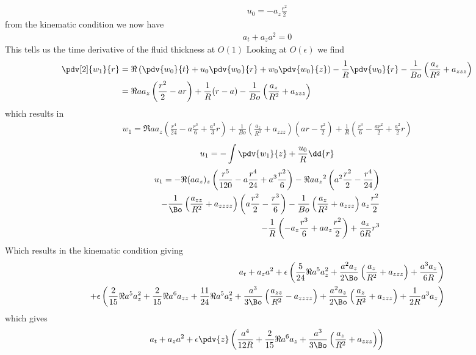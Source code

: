 \documentclass[12pt]{article}
\begin{document}
\begin{align}
u_0 = - a_z \frac{r^2}{2}
\end{align}
from the kinematic condition we now have
\begin{align}
a_t + a_za^2 = 0 
\end{align}
This tells us the time derivative of the fluid thickness at $O(1)$
Looking at $O(\epsilon)$ we find 
\begin{align}
\pdv[2]{w_1}{r}& = \Re\left(\pdv{w_0}{t}+ u_0\pdv{w_0}{r}+ w_0\pdv{w_0}{z}\right)- \frac{1}{R}\pdv{w_0}{r} -\frac{1}{Bo}\left(\frac{a_z}{R^2}+a_{zzz}\right)\\&
=\Re aa_z\left(\frac{r^2}{2}- a r\right)+\frac{1}{R}(r-a) -\frac{1}{Bo}\left(\frac{a_z}{R^2}+a_{zzz}\right)
\end{align}
which results in 
\begin{align}
w_1 = \Re a a_z\left(\frac{r^4}{24}- a\frac{r^3}{6}+\frac{a^3}{3}r\right)+ \frac{1}{Bo}\left(\frac{a_z}{R^2}+a_{zzz}\right)\left(ar - \frac{r^2}{2}\right)+\frac{1}{R}\left(\frac{r^3}{6}- \frac{ar^2}{2}+ \frac{a^2}{2}r\right)
\end{align}
\begin{align}
u_1 = -\int{\pdv{w_1}{z}+ \frac{u_0}{R}\dd{r}}
\end{align}
\begin{align}
u_1 = -\Re (aa_z)_z\left(\frac{r^5}{120}- a\frac{r^4}{24}+a^3\frac{r^2}{6}\right)- \Re a {a_z}^2\left(a^2\frac{r^2}{2}-\frac{r^4}{24}\right)\\-\frac{1}{\Bo}\left(\frac{a_{zz}}{R^2}+a_{zzzz}\right)\left(a\frac{r^2}{2}- \frac{r^3}{6}\right)-\frac{1}{Bo}\left(\frac{a_z}{R^2}+a_{zzz}\right)a_z\frac{r^2}{2}\\
-\frac{1}{R}\left(-a_z\frac{r^3}{6}+aa_z \frac{r^2}{2}\right)+\frac{a_z}{6R}r^3
\end{align}
Which results in the kinematic condition giving 
\begin{align}
a_t + a_za^2+\epsilon\left(\frac{5}{24}\Re a^5a_z^2+\frac{a^2a_z}{2\Bo}\left(\frac{a_z}{R^2}+a_{zzz}\right)+\frac{a^3a_z}{6R}\right)\\+\epsilon\left(\frac{2}{15}\Re a^5 a_z^2+\frac{2}{15}\Re a^6a_{zz}+\frac{11}{24}\Re a^5 a_z^2+\frac{a^3}{3\Bo}\left(\frac{a_{zz}}{R^2}-a_{zzzz}\right)+\frac{a^2a_z}{2\Bo}\left(\frac{a_z}{R^2}+a_{zzz}\right)+\frac{1}{2R}a^3a_z\right)
\end{align}
which gives
\begin{align}
a_t + a_z a^2  +\epsilon\pdv{z}\left(\frac{a^4}{12R}+\frac{2}{15}\Re a^6a_z+ \frac{a^3}{3\Bo}\left(\frac{a_z}{R^2}+a_{zzz}\right)\right)
\end{align}
\end{document}
